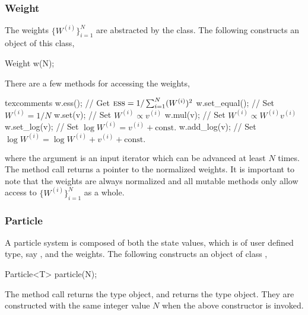 \documentclass[11pt,bib,mint,hyper,altcolor]{marticle}
\begin{document}
\subsubsection{Weight}
\label{ssub:Weight}

The weights $\{W^{(i)}\}_{i=1}^N$ are abstracted by the 
class. The following constructs an object of this class,
\begin{cppcode}
  Weight w(N);
\end{cppcode}
There are a few methods for accessing the weights,
\begin{cppcode*}{texcomments}
  w.ess();       // Get $\text{\normalfont\textsc{ess}} = 1/\sum_{i=1}^N(W^{(i)})^2$
  w.set_equal(); // Set $W^{(i)} = 1/N$
  w.set(v);      // Set $W^{(i)} \propto v^{(i)}$
  w.mul(v);      // Set $W^{(i)} \propto W^{(i)} v^{(i)}$
  w.set_log(v);  // Set $\log W^{(i)} = v^{(i)} + \text{const.}$
  w.add_log(v);  // Set $\log W^{(i)} = \log W^{(i)} + v^{(i)} + \text{const.}$
\end{cppcode*}
where the argument  is an input iterator which can be advanced at
least $N$ times. The method call  returns a pointer to the
normalized weights. It is important to note that the weights are always
normalized and all mutable methods only allow access to $\{W^{(i)}\}_{i=1}^N$
as a whole.

\subsubsection{Particle}
\label{ssub:Particle}

A particle system is composed of both the state values, which is of user
defined type, say , and the weights. The following constructs an
object of class ,
\begin{cppcode}
  Particle<T> particle(N);
\end{cppcode}
The method call  returns the type 
object, and  returns the type 
object. They are constructed with the same integer value $N$ when the above
constructor is invoked.
\end{document}
